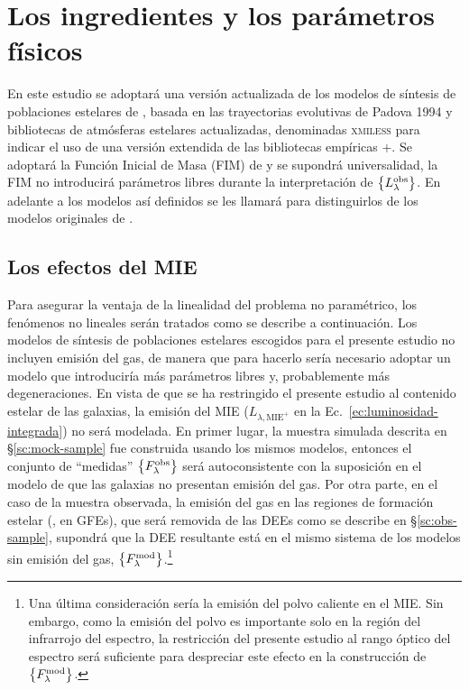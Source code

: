 
\section{Los ingredientes y los parámetros físicos}

En este estudio se adoptará una versión actualizada de los modelos de síntesis de poblaciones
estelares de , basada en las trayectorias evolutivas de Padova 1994
\citep{Alongi1993, Bressan1993, Fagotto1994a, Fagotto1994b, Girardi1996} y bibliotecas de atmósferas
estelares actualizadas, denominadas \textsc{xmiless} para indicar el uso de una versión extendida de
las bibliotecas empíricas \miles{}$+$\stelib \citep{SanchezBlazquez2006, LeBorgne2003}. Se adoptará
la Función Inicial de Masa (FIM) de \citet{Chabrier2003} y se supondrá universalidad, \ie la FIM no
introducirá parámetros libres durante la interpretación de $\set{\sedt{obs}}$. En adelante a los
modelos así definidos se les llamará  para distinguirlos de los modelos originales de \bc.

\subsection{Los efectos del MIE}

Para asegurar la ventaja de la linealidad del problema no paramétrico, los fenómenos no lineales
serán tratados como se describe a continuación. Los modelos de síntesis de poblaciones estelares
escogidos para el presente estudio no incluyen emisión del gas, de manera que para hacerlo sería
necesario adoptar un modelo \citep[\eg,][]{Charlot2001} que introduciría más parámetros libres y,
probablemente más degeneraciones. En vista de que se ha restringido el presente estudio al contenido
estelar de las galaxias, la emisión del MIE ($L_{\lambda,\text{MIE}^+}$ en la
Ec.~\ref{ec:luminosidad-integrada}) no será modelada. En primer lugar, la muestra simulada descrita
en \S\ref{sc:mock-sample} fue construida usando los mismos modelos, entonces el conjunto de
``medidas'' $\set{\sedt[F]{obs}}$ será autoconsistente con la suposición en el modelo de que las
galaxias no presentan emisión del gas. Por otra parte, en el caso de la muestra observada, la
emisión del gas en las regiones de formación estelar (\eg, en GFEs), que será removida de las DEEs
como se describe en \S\ref{sc:obs-sample}, supondrá que la DEE resultante está en el mismo sistema
de los modelos sin emisión del gas, $\set{\sedt[F]{mod}}$.\footnote{Una última consideración sería
la emisión del polvo caliente en el MIE. Sin embargo, como la emisión del polvo es importante solo
en la región del infrarrojo del espectro, la restricción del presente estudio al rango óptico del
espectro será suficiente para despreciar este efecto en la construcción de $\set{\sedt[F]{mod}}$.}

